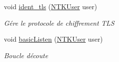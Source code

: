 \begin{DoxyCompactItemize}
void \mbox{\hyperlink{class_n_t_k_1_1_n_t_k_server_a6795dea242e466797582ba362fcbe63f}{ident\+\_\+tls}} (\mbox{\hyperlink{class_n_t_k_1_1_n_t_k_user}{N\+T\+K\+User}} user)
\begin{DoxyCompactList}\small\item\em Gére le protocole de chiffrement T\+LS \end{DoxyCompactList}\item 
void \mbox{\hyperlink{class_n_t_k_1_1_n_t_k_server_a916c59bcf5c272de1b7fa35c77de9ce2}{basic\+Listen}} (\mbox{\hyperlink{class_n_t_k_1_1_n_t_k_user}{N\+T\+K\+User}} user)
\begin{DoxyCompactList}\small\item\em Boucle d\textquotesingle{}écoute \end{DoxyCompactList}\end{DoxyCompactItemize}
